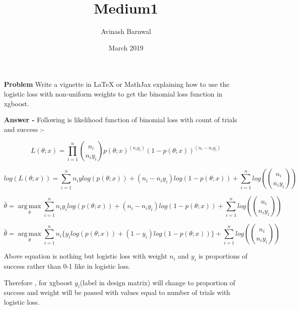 \documentclass{article}
\title{Medium1}
\author{Avinash Barnwal}
\date{March 2019}
\begin{document}
\maketitle

\begin{flushleft}

\textbf{Problem} Write a vignette in LaTeX or MathJax explaining how to use the logistic loss with non-uniform weights to get the binomial loss function in xgboost.

\textbf{Answer -} 
Following is likelihood function of binomial loss with count of trials and success :-

\begin{equation}
    L(\theta;x) = \prod_{i=1}^n {n_i\choose n_iy_i}p(\theta;x)^{(n_iy_i)}(1-p(\theta;x))^{(n_i-n_iy_i)}
\end{equation}


\begin{equation}
    log(L(\theta;x)) = \sum_{i=1}^n n_iy log(p(\theta;x)) + {(n_i-n_iy_i)}log(1-p(\theta;x)) + \sum_{i=1}^n log({n_i\choose n_iy_i})
\end{equation}


\begin{equation}
    \hat{\theta} = \underset{\theta}{\operatorname{arg\,max}}\sum_{i=1}^n n_iy_i log(p(\theta;x)) + {(n_i-n_iy_i)}log(1-p(\theta;x)) + \sum_{i=1}^n log({n_i\choose n_iy_i})
\end{equation}

\begin{equation}
    \hat{\theta} = \underset{\theta}{\operatorname{arg\,max}}\sum_{i=1}^n n_i\{y_i log(p(\theta;x)) + {(1-y_i)}log(1-p(\theta;x))\} + \sum_{i=1}^n log({n_i\choose n_iy_i})
\end{equation}

Above equation is nothing but logistic loss with weight $n_i$ and $y_i$ is proportions of success rather than 0-1 like in logistic loss.

Therefore , for xgboost $y_i$(label in design matrix)  will change to proportion of success and weight will be passed with values equal to number of trials with logistic loss.

\end{flushleft}
\end{document}
